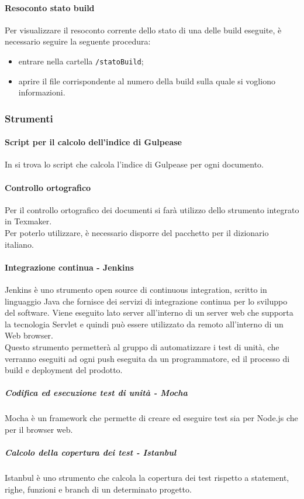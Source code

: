 \paragraph{Resoconto stato build}
Per visualizzare il resoconto corrente dello stato di una delle build eseguite, è necessario seguire la seguente procedura:
\begin{itemize}
	\item entrare nella cartella \texttt{/statoBuild};
	\item aprire il file corrispondente al numero della build sulla quale si vogliono informazioni.
\end{itemize}

\subsubsection{Strumenti}
\paragraph{Script per il calcolo dell'indice di Gulpease}
In \GulScript{} si trova lo script che calcola l'indice di Gulpease per ogni documento.
\paragraph{Controllo ortografico}
Per il controllo ortografico dei documenti si farà utilizzo dello strumento integrato in Texmaker.\\
Per poterlo utilizzare, è necessario disporre del pacchetto per il dizionario italiano.
\paragraph{Integrazione continua - Jenkins}
Jenkins è uno strumento open source di continuous integration, scritto in linguaggio Java che fornisce dei servizi di integrazione continua per lo sviluppo del software. Viene eseguito lato server all'interno di un server web che supporta la tecnologia Servlet e quindi può essere utilizzato da remoto all'interno di un Web browser.\\
Questo strumento permetterà al gruppo di automatizzare i test di unità, che verranno eseguiti ad ogni push eseguita da un programmatore, ed il processo di build e deployment del prodotto.
\subparagraph{Codifica ed esecuzione test di unità - Mocha}
Mocha è un framework che permette di creare ed eseguire test sia per Node.js che per il browser web.
\subparagraph{Calcolo della copertura dei test - Istanbul}
Istanbul è uno strumento che calcola la copertura dei test rispetto a statement, righe, funzioni e branch di un determinato progetto.


